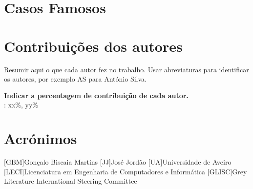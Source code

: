 \documentclass{report}
\begin{document}
\chapter {Casos Famosos}

\chapter*{Contribuições dos autores}
Resumir aqui o que cada autor fez no trabalho.
Usar abreviaturas para identificar os autores,
por exemplo AS para António Silva.

\vspace{10pt}
\textbf{Indicar a percentagem de contribuição de cada autor.}\\

\autores : xx\%, yy\%\\

\chapter*{Acrónimos}
\begin{acronym}
[GBM]{Gonçalo Biscaia Martins}
[JJ]{José Jordão}
[UA]{Universidade de Aveiro}
[LECI]{Licenciatura em Engenharia de Computadores e Informática}
[GLISC]{Grey Literature International Steering Committee}
\end{acronym}


\printbibliography
\end{document}
